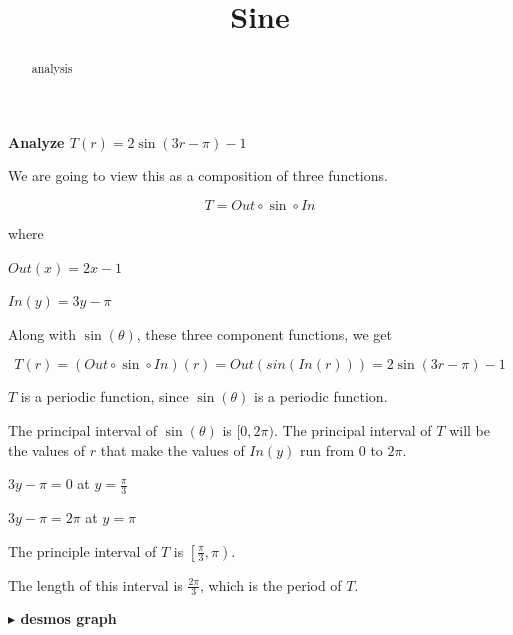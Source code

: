 \documentclass{ximera}
\title{Sine}
\begin{document}
\begin{abstract}
analysis
\end{abstract}
\maketitle












\textbf{\textcolor{purple!85!blue}{Analyze  $T(r) =  2 \sin(3r - \pi) - 1$}}



\begin{template}


We are going to view this as a composition of three functions.


\[
T = Out \circ \sin \circ In
\]


where


$Out(x) = 2x - 1$ 


$In(y) = 3y - \pi$ 




Along with $\sin(\theta)$, these three component functions, we get



\[
T(r) = (Out \circ \sin \circ In)(r) = Out(sin(In(r)))  = 2 \sin(3r - \pi) - 1
\]




\end{template}

$T$ is a periodic function, since $\sin(\theta)$ is a periodic function. 

The principal interval of $\sin(\theta)$ is $[0, 2\pi)$.  The principal interval of $T$ will be the values of $r$ that make the values of $In(y)$ run from $0$ to $2\pi$. 


$3y - \pi = 0$ at $y = \frac{\pi}{3}$

$3y - \pi = 2\pi$ at $y = \pi$

The principle interval of $T$ is $\left[ \frac{\pi}{3}, \pi \right)$. 

The length of this interval is $\frac{2\pi}{3}$, which is the period of $T$. 









\textbf{\textcolor{blue!55!black}{$\blacktriangleright$ desmos graph}} 
\begin{center}
\end{center}
\end{document}
